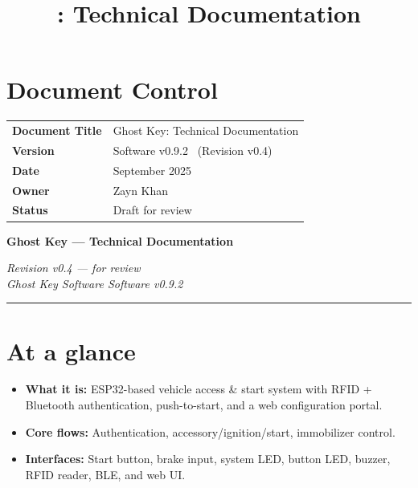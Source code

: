 \documentclass[11pt]{article}
\title{\product: Technical Documentation}
\date{\docdate}
\newcommand{\product}{Ghost Key}
\newcommand{\softver}{Software v0.9.2}
\newcommand{\revver}{Revision v0.4}
\newcommand{\docdate}{September 2025}
\newcommand{\docauthor}{Zayn Khan}
\begin{document}
\maketitle

\section*{Document Control}
\begin{tabularx}{\linewidth}{@{}lY@{}}
\toprule
\textbf{Document Title} & \product: Technical Documentation \\
\textbf{Version}        & \softver{} \ (\revver) \\
\textbf{Date}           & \docdate \\
\textbf{Owner}          & \docauthor \\
\textbf{Status}         & Draft for review \\
\bottomrule
\end{tabularx}

\tableofcontents
\listoffigures
\clearpage


\textbf{\Large Ghost Key --- Technical Documentation}

\emph{\revver{} --- for review}\\
\emph{\product{} Software \softver}

\medskip\hrule\medskip

\section{At a glance}
\begin{itemize}
  \item \textbf{What it is:} ESP32-based vehicle access \& start system with RFID + Bluetooth authentication, push-to-start, and a web configuration portal.
  \item \textbf{Core flows:} Authentication, accessory/ignition/start, immobilizer control.
  \item \textbf{Interfaces:} Start button, brake input, system LED, button LED, buzzer, RFID reader, BLE, and web UI.
\end{itemize}
\end{document}
